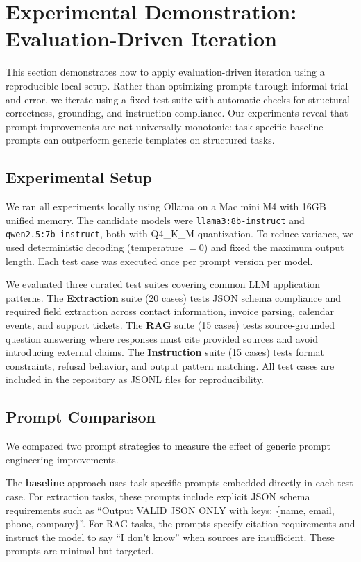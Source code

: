 
\section{Experimental Demonstration: Evaluation-Driven Iteration}
\label{sec:experiments}

This section demonstrates how to apply evaluation-driven iteration using a reproducible local setup. Rather than optimizing prompts through informal trial and error, we iterate using a fixed test suite with automatic checks for structural correctness, grounding, and instruction compliance. Our experiments reveal that prompt improvements are not universally monotonic: task-specific baseline prompts can outperform generic templates on structured tasks.

\subsection{Experimental Setup}

We ran all experiments locally using Ollama on a Mac mini M4 with 16GB unified memory. The candidate models were \texttt{llama3:8b-instruct} and \texttt{qwen2.5:7b-instruct}, both with Q4\_K\_M quantization. To reduce variance, we used deterministic decoding (temperature $= 0$) and fixed the maximum output length. Each test case was executed once per prompt version per model.

We evaluated three curated test suites covering common LLM application patterns. The \textbf{Extraction} suite (20 cases) tests JSON schema compliance and required field extraction across contact information, invoice parsing, calendar events, and support tickets. The \textbf{RAG} suite (15 cases) tests source-grounded question answering where responses must cite provided sources and avoid introducing external claims. The \textbf{Instruction} suite (15 cases) tests format constraints, refusal behavior, and output pattern matching. All test cases are included in the repository as JSONL files for reproducibility.

\subsection{Prompt Comparison}

We compared two prompt strategies to measure the effect of generic prompt engineering improvements.

The \textbf{baseline} approach uses task-specific prompts embedded directly in each test case. For extraction tasks, these prompts include explicit JSON schema requirements such as ``Output VALID JSON ONLY with keys: \{name, email, phone, company\}''. For RAG tasks, the prompts specify citation requirements and instruct the model to say ``I don't know'' when sources are insufficient. These prompts are minimal but targeted.

